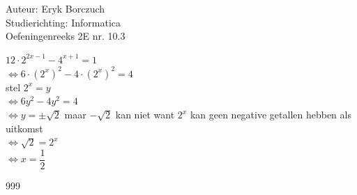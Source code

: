 \documentclass[a4paper]{article}
\begin{document}
  
\noindent \large Auteur: Eryk Borczuch \\
\noindent \large Studierichting: Informatica\\
\noindent \large Oefeningenreeks 2E nr. 10.3\\

\medskip

\normalsize

$12 \cdot 2^{2x-1}-4^{x+1} = 1$\\

$\Leftrightarrow 6\cdot \left(2^x\right)^2 -4 \cdot \left(2^x \right)^2 =4$\\

stel $2^x =y$\\

$\Leftrightarrow 6y^2 -4y^2 = 4$\\

$\Leftrightarrow y = \pm \sqrt{2}$ maar $-\sqrt{2}$ kan niet want $2^x $ kan geen negative getallen hebben als uitkomst\\

$\Leftrightarrow \sqrt{2} = 2^x$\\

$\Leftrightarrow x = \dfrac{1}{2}$\\

\begin{thebibliography}{999}
\end{thebibliography}
\end{document}
